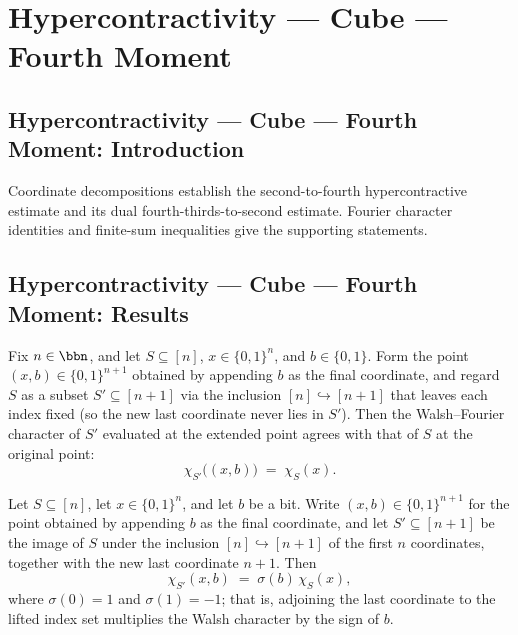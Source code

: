 \section{Hypercontractivity --- Cube --- Fourth Moment}
\subsection*{Hypercontractivity --- Cube --- Fourth Moment: Introduction}
Coordinate decompositions establish the second-to-fourth hypercontractive estimate and its dual fourth-thirds-to-second estimate. Fourier character identities and finite-sum inequalities give the supporting statements.

\subsection*{Hypercontractivity --- Cube --- Fourth Moment: Results}

\begin{lemma}
\leanok
{}
\label{BooleanAnalysis.Hypercontractivity.chiS_snoc_castSucc}
Fix $n\in\bbn$, and let $S\subseteq[n]$, $x\in\{0,1\}^n$, and $b\in\{0,1\}$. Form the
point $(x,b)\in\{0,1\}^{n+1}$ obtained by appending $b$ as the final coordinate, and
regard $S$ as a subset $S'\subseteq[n+1]$ via the inclusion $[n]\hookrightarrow[n+1]$
that leaves each index fixed (so the new last coordinate never lies in $S'$). Then the
Walsh--Fourier character of $S'$ evaluated at the extended point agrees with that of $S$
at the original point:
\[
  \chi_{S'}\big((x,b)\big) \;=\; \chi_S(x).
\]
\end{lemma}

\begin{lemma}
\leanok
{}
\label{BooleanAnalysis.Hypercontractivity.chiS_snoc_with_last}
Let $S \subseteq [n]$, let $x \in \{0,1\}^n$, and let $b$ be a bit. Write $(x,b) \in
\{0,1\}^{n+1}$ for the point obtained by appending $b$ as the final coordinate, and let
$S' \subseteq [n+1]$ be the image of $S$ under the inclusion $[n] \hookrightarrow [n+1]$
of the first $n$ coordinates, together with the new last coordinate $n+1$. Then
\[
  \chi_{S'}(x,b) \;=\; \sigma(b)\,\chi_S(x),
\]
where $\sigma(0)=1$ and $\sigma(1)=-1$; that is, adjoining the last coordinate to the
lifted index set multiplies the Walsh character by the sign of $b$.
\end{lemma}

